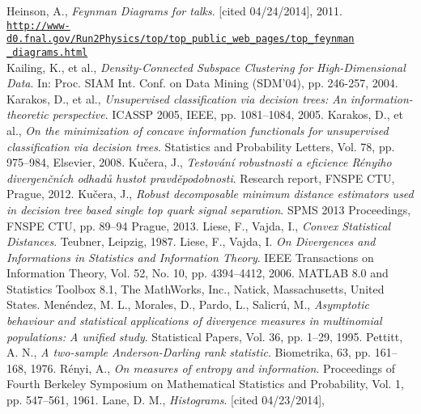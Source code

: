 \begin{thebibliography}{10}
Heinson, A., {\em Feynman Diagrams for talks}. [cited 04/24/2014], 2011. \\ \href{http://www-d0.fnal.gov/Run2Physics/top/top_public_web_pages/top_feynman_diagrams.html}{\texttt{http://www-d0.fnal.gov/Run2Physics/top/top\_public\_web\_pages/top\_feynman}} \\
\href{http://www-d0.fnal.gov/Run2Physics/top/top_public_web_pages/top_feynman_diagrams.html}{\texttt{\_diagrams.html}}\\
 Kailing, K., et al., {\em Density-Connected Subspace Clustering for High-Dimensional Data}. In: Proc. SIAM Int. Conf. on Data Mining (SDM'04), pp. 246-257, 2004.
 Karakos, D., et al., {\em Unsupervised classification via decision trees: An information-theoretic perspective}. ICASSP 2005, IEEE, pp. 1081--1084, 2005.
 Karakos, D., et al., {\em On the minimization of concave information functionals for unsupervised classification via decision trees}. Statistics and Probability Letters, Vol. 78, pp. 975--984,  Elsevier, 2008.
Ku\v cera, J., {\em Testov\' an\'i robustnosti a eficience R\' enyiho divergen\v cn\' ich odhad\r u hustot pravd\v epodobnosti}. Research report, FNSPE CTU, Prague, 2012.
Ku\v cera, J., {\em Robust \ren decomposable minimum distance estimators used in decision tree based single top quark  signal separation}. SPMS 2013 Proceedings, FNSPE CTU, pp. 89--94 Prague, 2013.
Liese, F., Vajda, I., {\em Convex Statistical Distances}. Teubner, Leipzig, 1987.
Liese, F., Vajda, I. {\em On Divergences and Informations in Statistics and Information Theory}. IEEE Transactions on Information Theory, Vol. 52, No. 10, pp. 4394--4412, 2006.
 MATLAB 8.0 and Statistics Toolbox 8.1, The MathWorks, Inc., Natick, Massachusetts, United States.
 Men\'endez, M. L., Morales, D., Pardo, L., Salicr\'u, M., {\em Asymptotic behaviour and statistical applications of divergence measures in multinomial populations: A unified study}. Statistical Papers, Vol. 36, pp. 1--29, 1995.
Pettitt, A. N., {\em A two-sample Anderson-Darling rank statistic}. Biometrika, 63, pp. 161--168, 1976.
 R\'enyi, A., {\em On measures of entropy and information}. Proceedings of Fourth Berkeley Symposium on Mathematical Statistics and Probability, Vol. 1, pp. 547--561, 1961.
 Lane, D. M., {\em Histograms}. [cited 04/23/2014], \\

\end{thebibliography}
